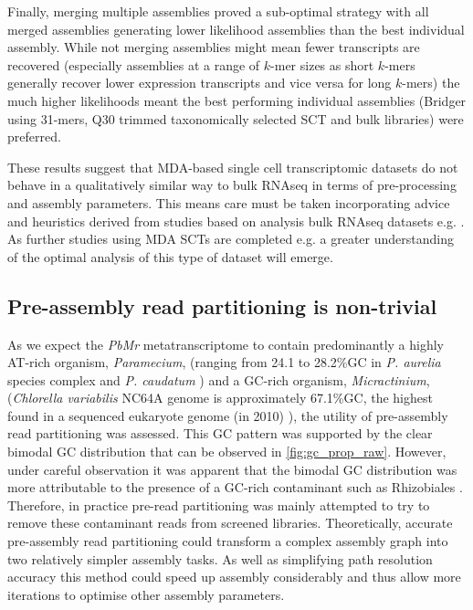 Finally, merging multiple assemblies proved a sub-optimal strategy with all
merged assemblies generating lower likelihood assemblies than the
best individual assembly.  While not merging assemblies might mean fewer
transcripts are recovered
(especially assemblies at a range of \(k\)-mer sizes as short \(k\)-mers generally recover lower expression transcripts
and vice versa for long \(k\)-mers) the much higher likelihoods meant the
best performing individual assemblies (Bridger using 31-mers, Q30 trimmed
taxonomically selected SCT and bulk libraries) were preferred.

These results suggest that MDA-based single cell transcriptomic datasets
do not behave in a qualitatively similar way to bulk RNAseq in terms of
pre-processing and assembly parameters.  
This means care must be taken incorporating advice and heuristics
derived from studies based on analysis bulk RNAseq datasets e.g. \citep{Macmanes2013,Macmanes2014,Macmanes2015,Nakasugi2014}.
As further studies using MDA SCTs are completed e.g. \citep{Kolisko2014} 
a greater understanding of the optimal analysis of this type of 
dataset will emerge.

\subsection{Pre-assembly read partitioning is non-trivial}

As we expect the \textit{PbMr} metatranscriptome to contain predominantly a highly AT-rich organism, \textit{Paramecium},
(ranging from 24.1 to 28.2\%GC in \textit{P. aurelia} species complex and \textit{P. caudatum} \citep{Aury2006,McGrath2014})
and a GC-rich organism, \textit{Micractinium}, (\textit{Chlorella variabilis} NC64A genome is approximately 67.1\%GC, the highest
found in a sequenced eukaryote genome (in 2010) \citep{Blanc2010}), the utility of pre-assembly read partitioning was assessed.
This GC pattern was supported by the clear bimodal GC distribution that can be observed in \cref{fig:gc_prop_raw}.
However, under careful observation it was apparent that the bimodal GC distribution was more attributable to 
the presence of a GC-rich contaminant such as Rhizobiales \citep{Peralta2011}.  Therefore, in practice pre-read partitioning was mainly attempted to 
try to remove these contaminant reads from screened libraries.
Theoretically, accurate pre-assembly read partitioning could transform a complex assembly graph into two relatively simpler
assembly tasks.  As well as simplifying path resolution accuracy this method could
 speed up assembly considerably and thus allow more iterations to optimise other
assembly parameters.

